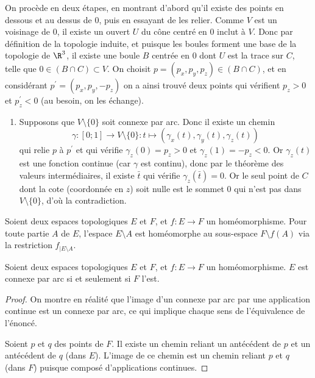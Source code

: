 On procède en deux étapes, en montrant d'abord qu'il
   existe des points en \og dessous\fg{} et au \og dessus\fg{} de
   $0$, puis en essayant de les relier.
     Comme $V$ est un voisinage de $0$, il existe un ouvert $U$ du
     cône centré en $0$ inclut à $V$. Donc par définition de la
     topologie induite, et puisque les boules forment une base de la
     topologie de $\R^3$, il existe une boule $B$ centrée en $0$ dont
     $U$ est la trace sur $C$, telle que $0 \in (B \cap C) \subset
     V$. On choisit $p = (p_x,p_y,p_z) \in (B \cap C)$, et en
     considérant $p^\prime = (p_x, p_y, -p_z)$ on a ainsi trouvé deux
     points qui vérifient $p_z > 0$ et $p^\prime_z < 0$ (au besoin,
     on les échange).

   \begin{enumerate}
   \item Supposons que $V\setminus\{0\}$ soit connexe par arc. Donc
     il existe un chemin
     \[\gamma : [0;1] \to V\setminus\{0\} : t \mapsto
     (\gamma_x(t),\gamma_y(t),\gamma_z(t))\] qui relie $p$ à
     $p^\prime$ et qui vérifie $\gamma_z(0) = p_z > 0$ et
     $\gamma_z(1) = -p_z < 0$. Or $\gamma_z(t)$ est une fonction
     continue (car $\gamma$ est continu), donc par le théorème des
     valeurs intermédiaires, il existe $\bar t$ qui vérifie
     $\gamma_z(\bar t) = 0$. Or le seul point de $C$ dont la cote
     (coordonnée en $z$) soit nulle est le sommet $0$ qui n'est pas
     dans $V\setminus\{0\}$, d'où la contradiction.
   \end{enumerate}

 \begin{rem}Soient deux espaces topologiques $E$ et $F$, et $f :
   E\to F$ un homéomorphisme. Pour toute partie $A$ de $E$,
   l'espace $E\setminus A$ est homéomorphe au sous-espace $F\setminus
   f(A)$ via la restriction $f_{\vert E\setminus A}$.\end{rem}

 \begin{lem}Soient deux espaces topologiques $E$ et $F$, et $f :
   E\to F$ un homéomorphisme. $E$ est connexe par arc si et
   seulement si $F$ l'est.\end{lem}
 \begin{proof}On montre en réalité que l'image d'un connexe par arc
   par une application continue est un connexe par arc, ce qui
   implique chaque sens de l'équivalence de l'énoncé.

   Soient $p$ et $q$ des points de $F$. Il existe un chemin reliant
   un antécédent de $p$ et un antécédent de $q$ (dans $E$). L'image
   de ce chemin est un chemin reliant $p$ et $q$ (dans $F$) puisque
   composé d'applications continues.
 \end{proof}


